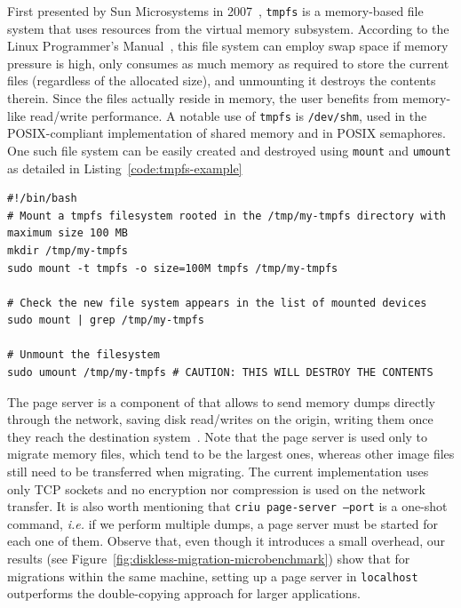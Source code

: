 First presented by Sun Microsystems in 2007~\cite{Snyder2007}, \texttt{tmpfs} is a memory-based file system that uses resources from the virtual memory subsystem.
According to the Linux Programmer's Manual~\cite{tmpfs-manpage}, this file system can employ swap space if memory pressure is high, only consumes as much memory as required to store the current files (regardless of the allocated size), and unmounting it destroys the contents therein.
Since the files actually reside in memory, the user benefits from memory-like read/write performance.
A notable use of \texttt{tmpfs} is \texttt{/dev/shm}, used in the POSIX-compliant implementation of shared memory and in POSIX semaphores.
One such file system can be easily created and destroyed using \texttt{mount} and \texttt{umount} as detailed in Listing~\ref{code:tmpfs-example}
\begin{lstlisting}[style=Bash,caption={Mounting and dismounting a \texttt{tmpfs} filesystem.\label{code:tmpfs-example}}]
#!/bin/bash
# Mount a tmpfs filesystem rooted in the /tmp/my-tmpfs directory with maximum size 100 MB
mkdir /tmp/my-tmpfs
sudo mount -t tmpfs -o size=100M tmpfs /tmp/my-tmpfs

# Check the new file system appears in the list of mounted devices
sudo mount | grep /tmp/my-tmpfs

# Unmount the filesystem 
sudo umount /tmp/my-tmpfs # CAUTION: THIS WILL DESTROY THE CONTENTS
\end{lstlisting}

The page server is a component of \criu that allows to send memory dumps directly through the network, saving disk read/writes on the origin, writing them once they reach the destination system~\cite{criu-page-server}.
Note that the page server is used only to migrate memory files, which tend to be the largest ones, whereas other image files still need to be transferred when migrating.
The current implementation uses only TCP sockets and no encryption nor compression is used on the network transfer.
It is also worth mentioning that \texttt{criu page-server --port} is a one-shot command, \textit{i.e.} if we perform multiple dumps, a page server must be started for each one of them.
Observe that, even though it introduces a small overhead, our results (see Figure~\ref{fig:diskless-migration-microbenchmark}) show that for migrations within the same machine, setting up a page server in \texttt{localhost} outperforms the double-copying approach for larger applications.

